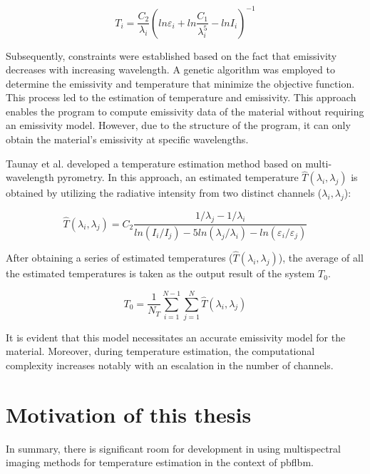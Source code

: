 \begin{equation}
    T_i=\frac{C_2}{\lambda_i}\left(ln\varepsilon_i + ln\frac{C_1}{\lambda^5_i} - lnI_i\right)^{-1}
\end{equation}


Subsequently, constraints were established based on the fact that emissivity 
decreases with increasing wavelength. A genetic algorithm was employed to 
determine the emissivity and temperature that minimize the objective 
function. This process led to the estimation of temperature and emissivity.
This approach enables the program to compute emissivity data of the material 
without requiring an emissivity model. However, due to the structure of 
the program, it can only obtain the material's emissivity at specific 
wavelengths.


Taunay et al. developed a temperature estimation method based on 
multi-wavelength pyrometry\cite{Taunay.2020b}. In this approach, 
an estimated temperature $\widehat{T}(\lambda_i, \lambda_j)$ is obtained by utilizing the radiative intensity 
from two distinct channels ($\lambda_i, \lambda_j$):

\begin{equation}
    \widehat{T}(\lambda_i, \lambda_j)=C_2 \frac{1/\lambda_j - 1/\lambda_i}{ln(I_i/I_j) - 5ln(\lambda_j / \lambda_i) - ln(\varepsilon_i / \varepsilon_j)}
\end{equation}


After obtaining a series of estimated temperatures ($\widehat{T}(\lambda_i, \lambda_j)$), 
the average of all the estimated temperatures is taken as the output result of the system $T_0$.

\begin{equation}
    T_0 = \frac{1}{N_T}\sum_{i = 1}^{N-1} \sum_{j = 1}^{N} \widehat{T}(\lambda_i, \lambda_j) 
\end{equation}

It is evident that this model necessitates an accurate emissivity model for the material. Moreover, during 
temperature estimation\cite{Taunay.2020b}, the computational complexity increases notably 
with an escalation in the number of channels.

\section{Motivation of this thesis}
In summary, there is significant room for development in using 
multispectral imaging methods for temperature estimation in the 
context of \gls{pbflbm}. 


